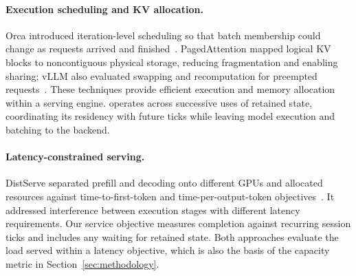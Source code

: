 \paragraph{Execution scheduling and KV allocation.}
Orca introduced iteration-level scheduling so that batch membership could change as requests arrived and finished~\cite{yu2022orca}.
PagedAttention mapped logical KV blocks to noncontiguous physical storage, reducing fragmentation and enabling sharing; vLLM also evaluated swapping and recomputation for preempted requests~\cite{kwon2023vllm}.
These techniques provide efficient execution and memory allocation within a serving engine.
\systemname operates across successive uses of retained state, coordinating its residency with future ticks while leaving model execution and batching to the backend.

\paragraph{Latency-constrained serving.}
DistServe separated prefill and decoding onto different GPUs and allocated resources against time-to-first-token and time-per-output-token objectives~\cite{zhong2024distserve}.
It addressed interference between execution stages with different latency requirements.
Our service objective measures completion against recurring session ticks and includes any waiting for retained state.
Both approaches evaluate the load served within a latency objective, which is also the basis of the capacity metric in Section~\ref{sec:methodology}.
